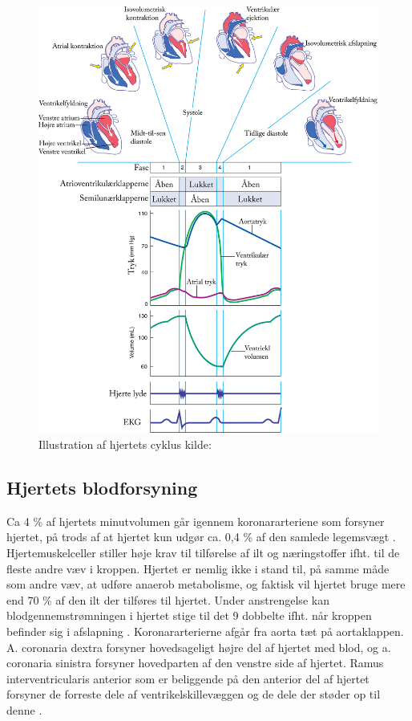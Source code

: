 \begin{figure}[H]
\includegraphics[scale=0.7]{figures/cyklus}
\caption{Illustration af hjertets cyklus kilde: \cite{cindy}}
\end{figure}

\subsection{Hjertets blodforsyning}
Ca 4 \% af hjertets minutvolumen går igennem koronararteriene som forsyner hjertet, på trods af at hjertet kun udgør ca. 0,4 \% af den samlede legemsvægt \cite{gronanatomi}. Hjertemuskelceller stiller høje krav til tilførelse af ilt og næringstoffer ifht. til de fleste andre væv i kroppen. Hjertet er nemlig ikke i stand til, på samme måde som andre væv, at udføre anaerob metabolisme, og faktisk vil hjertet bruge mere end 70 \% af den ilt der tilføres til hjertet. Under anstrengelse kan blodgennemstrømningen i hjertet stige til det 9 dobbelte ifht. når kroppen befinder sig i afslapning \cite{martini}. Koronararterierne afgår fra aorta tæt på aortaklappen. A. coronaria dextra forsyner hovedsageligt højre del af hjertet med blod, og a. coronaria sinistra forsyner hovedparten af den venstre side af hjertet. Ramus interventricularis anterior som er beliggende på den anterior del af hjertet forsyner de forreste dele af ventrikelskillevæggen og de dele der støder op til denne \cite{gronanatomi}.

